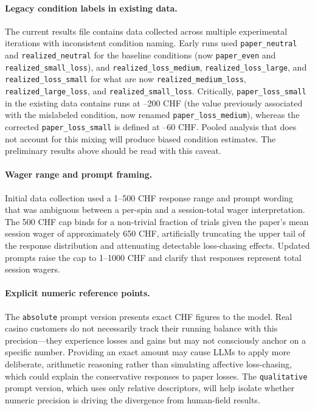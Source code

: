\documentclass[midterm]{sparreport}
\begin{document}
\paragraph{Legacy condition labels in existing data.}
The current results file contains data collected across multiple experimental
iterations with inconsistent condition naming. Early runs used \texttt{paper\_neutral}
and \texttt{realized\_neutral} for the baseline conditions (now
\texttt{paper\_even} and \texttt{realized\_small\_loss}), and
\texttt{realized\_loss\_medium}, \texttt{realized\_loss\_large}, and
\texttt{realized\_loss\_small} for what are now \texttt{realized\_medium\_loss},
\texttt{realized\_large\_loss}, and \texttt{realized\_small\_loss}. Critically,
\texttt{paper\_loss\_small} in the existing data contains runs at --200 CHF (the
value previously associated with the mislabeled condition, now renamed
\texttt{paper\_loss\_medium}), whereas the corrected \texttt{paper\_loss\_small}
is defined at --60 CHF. Pooled analysis that does not account for this mixing will
produce biased condition estimates. The preliminary results above should be read
with this caveat.

\paragraph{Wager range and prompt framing.}
Initial data collection used a 1--500 CHF response range and prompt wording that
was ambiguous between a per-spin and a session-total wager interpretation. The
500 CHF cap binds for a non-trivial fraction of trials given the paper's mean
session wager of approximately 650 CHF, artificially truncating the upper tail of
the response distribution and attenuating detectable loss-chasing effects. Updated
prompts raise the cap to 1--1000 CHF and clarify that responses represent total
session wagers.

\paragraph{Explicit numeric reference points.}
The \texttt{absolute} prompt version presents exact CHF figures to the model. Real
casino customers do not necessarily track their running balance with this
precision---they experience losses and gains but may not consciously anchor on a
specific number. Providing an exact amount may cause LLMs to apply more deliberate,
arithmetic reasoning rather than simulating affective loss-chasing, which could
explain the conservative responses to paper losses. The \texttt{qualitative} prompt
version, which uses only relative descriptors, will help isolate whether numeric
precision is driving the divergence from human-field results.
\end{document}
